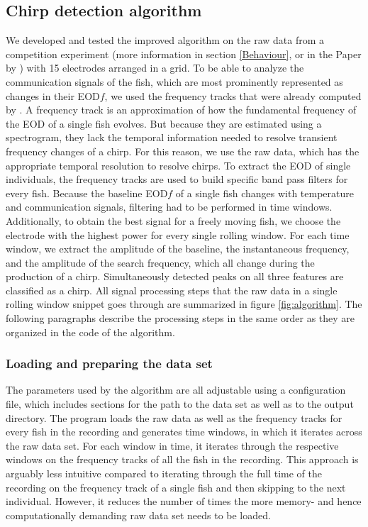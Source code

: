 \subsection{Chirp detection algorithm}

We developed and tested the improved algorithm on the raw data from a competition experiment (more information in section \ref{Behaviour}, or in the Paper by \cite{raabElectrocommunicationSignalsIndicate2021}) with 15 electrodes arranged in a grid. To be able to analyze the communication signals of the fish, which are most prominently represented as changes in their EOD$f$, we used the frequency tracks that were already computed by \textcite{raab2022AdvancesNoninvasiveTracking}. A frequency track is an approximation of how the fundamental frequency of the EOD of a single fish evolves. But because they are estimated using a spectrogram, they lack the temporal information needed to resolve transient frequency changes of a chirp. For this reason, we use the raw data, which has the appropriate temporal resolution to resolve chirps. To extract the EOD of single individuals, the frequency tracks are used to build specific band pass filters for every fish. Because the baseline EOD$f$ of a single fish changes with temperature and communication signals, filtering had to be performed in time windows. Additionally, to obtain the best signal for a freely moving fish, we choose the electrode with the highest power for every single rolling window. For each time window, we extract the amplitude of the baseline, the instantaneous frequency, and the amplitude of the search frequency, which all change during the production of a chirp. Simultaneously detected peaks on all three features are classified as a chirp. All signal processing steps that the raw data in a single rolling window snippet goes through are summarized in figure \ref{fig:algorithm}. The following paragraphs describe the processing steps in the same order as they are organized in the code of the algorithm. 

\subsubsection{Loading and preparing the data set}

The parameters used by the algorithm are all adjustable using a  configuration file, which includes sections for the path to the data set as well as to the output directory. The program loads the raw data as well as the frequency tracks for every fish in the recording and generates time windows, in which it iterates across the raw data set. For each window in time, it iterates through the respective windows on the frequency tracks of all the fish in the recording. This approach is arguably less intuitive compared to iterating through the full time of the recording on the frequency track of a single fish and then skipping to the next individual. However, it reduces the number of times the more memory- and hence computationally demanding raw data set needs to be loaded. 

